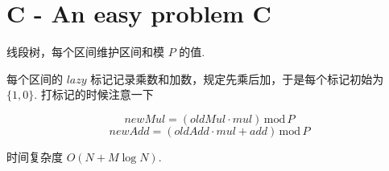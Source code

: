 \documentclass{ctexart}
\begin{document}
\section*{C - An easy problem C}

线段树，每个区间维护区间和模 $P$ 的值. 

每个区间的 $lazy$ 标记记录乘数和加数，规定先乘后加，于是每个标记初始为 $\{1,0\}$.
打标记的时候注意一下

\[
newMul = (oldMul \cdot mul)\,\mathrm{mod}\,P
\]
\[
  newAdd = (oldAdd \cdot mul + add)\,\mathrm{mod}\,P
\]

时间复杂度 $O(N+M\log{N})$.
\end{document}
